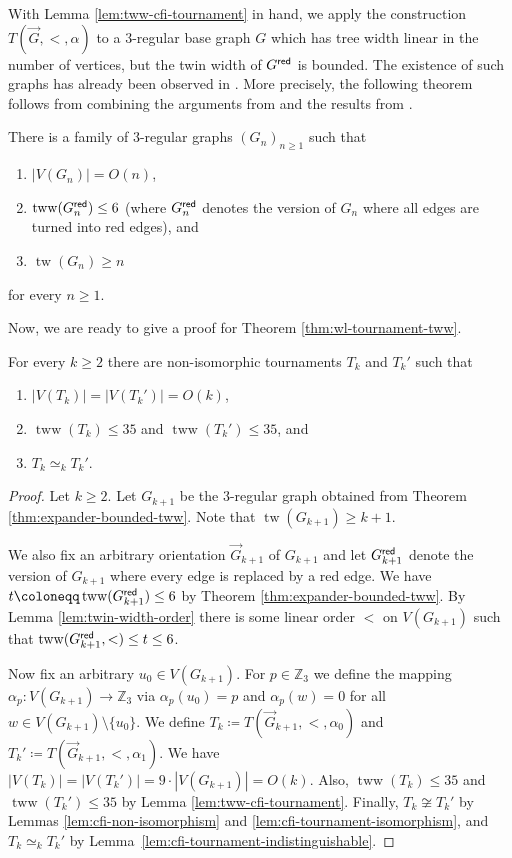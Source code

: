 \documentclass{theoretics}
\newcommand{\ZZ}{{\mathbb Z}}
\newcommand{\red}{{\sf red}}
\DeclareMathOperator{\tw}{tw}
\DeclareMathOperator{\tww}{tww}
\begin{document}
With Lemma \ref{lem:tww-cfi-tournament} in hand, we apply the construction $T(\vec{G},<,\alpha)$ to a $3$-regular base graph $G$ which has tree width linear in the number of vertices, but the twin width of $G^{\red}$ is bounded.
The existence of such graphs has already been observed in \cite{BonnetGKTW22}.
More precisely, the following theorem follows from combining the arguments from \cite[Lemma 5.1]{BonnetGKTW22} and the results from \cite{BiluL06,MarcusSS15}.

\begin{theorem}
 \label{thm:expander-bounded-tww}
 There is a family of $3$-regular graphs $(G_n)_{n \geq 1}$ such that
 \begin{enumerate}
  \item $|V(G_n)| = O(n)$,
  \item $\tww(G_n^{\red}) \leq 6$ (where $G_n^{\red}$ denotes the version of $G_n$ where all edges are turned into red edges), and
  \item $\tw(G_n) \geq n$
 \end{enumerate}
 for every $n \geq 1$.
\end{theorem}

Now, we are ready to give a proof for Theorem \ref{thm:wl-tournament-tww}.

\begin{theorem}
 For every $k \geq 2$ there are non-isomorphic tournaments $T_k$ and $T_k'$ such that
 \begin{enumerate}
  \item $|V(T_k)| = |V(T_k')| = O(k)$,
  \item $\tww(T_k) \leq 35$ and $\tww(T_k') \leq 35$, and
  \item $T_k \simeq_k T_k'$.
 \end{enumerate}
\end{theorem}

\begin{proof}
 Let $k \geq 2$.
 Let $G_{k+1}$ be the $3$-regular graph obtained from Theorem \ref{thm:expander-bounded-tww}.
 Note that $\tw(G_{k+1}) \geq k+1$.

 We also fix an arbitrary orientation $\vec{G}_{k+1}$ of $G_{k+1}$ and let $G_{k+1}^{\red}$ denote the version of $G_{k+1}$ where every edge is replaced by a red edge.
 We have $t \coloneqq \tww(G_{k+1}^{\red}) \leq 6$ by Theorem \ref{thm:expander-bounded-tww}.
 By Lemma \ref{lem:twin-width-order} there is some linear order $<$ on $V(G_{k+1})$ such that $\tww(G_{k+1}^\red,<) \leq t \leq 6$.

 Now fix an arbitrary $u_0 \in V(G_{k+1})$.
 For $p \in \ZZ_3$ we define the mapping $\alpha_p \colon V(G_{k+1}) \to \ZZ_3$ via $\alpha_p(u_0) = p$ and $\alpha_p(w) = 0$ for all $w \in V(G_{k+1}) \setminus \{u_0\}$.
 We define $T_k \coloneqq T(\vec{G}_{k+1},<,\alpha_0)$ and $T_k' \coloneqq T(\vec{G}_{k+1},<,\alpha_1)$.
 We have $|V(T_k)| = |V(T_k')| = 9 \cdot |V(G_{k+1})| = O(k)$.
 Also, $\tww(T_k) \leq 35$ and $\tww(T_k') \leq 35$ by Lemma \ref{lem:tww-cfi-tournament}.
 Finally, $T_k \not\cong T_k'$ by Lemmas \ref{lem:cfi-non-isomorphism} and \ref{lem:cfi-tournament-isomorphism}, and $T_k \simeq_k T_k'$ by Lemma~\ref{lem:cfi-tournament-indistinguishable}.
\end{proof}
\end{document}
